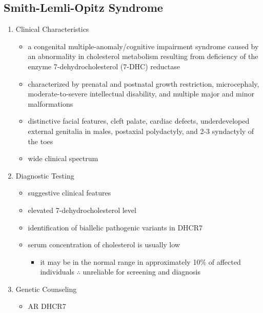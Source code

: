 \documentclass[12pt]{scrartcl}
\begin{document}
\subsection{Smith-Lemli-Opitz Syndrome}
\label{sec:org9017ae0}
\begin{enumerate}
\item Clinical Characteristics
\label{sec:org221a1e0}
\begin{itemize}
\item a congenital multiple-anomaly/cognitive impairment syndrome caused
by an abnormality in cholesterol metabolism resulting from
deficiency of the enzyme 7-dehydrocholesterol (7-DHC) reductase
\item characterized by prenatal and postnatal growth restriction,
microcephaly, moderate-to-severe intellectual disability, and
multiple major and minor malformations
\item distinctive facial features, cleft palate, cardiac defects,
underdeveloped external genitalia in males, postaxial polydactyly,
and 2-3 syndactyly of the toes
\item wide clinical spectrum
\end{itemize}
\item Diagnostic Testing
\label{sec:orgf1c4a53}
\begin{itemize}
\item suggestive clinical features
\item elevated 7-dehydrocholesterol level
\item identification of biallelic pathogenic variants in DHCR7
\item serum concentration of cholesterol is usually low
\begin{itemize}
\item it may be in the normal range in approximately 10\% of affected
individuals \(\therefore\) unreliable for screening and diagnosis
\end{itemize}
\end{itemize}
\item Genetic Counseling
\label{sec:org8983fa2}
\begin{itemize}
\item AR DHCR7
\end{itemize}
\end{enumerate}
\end{document}
